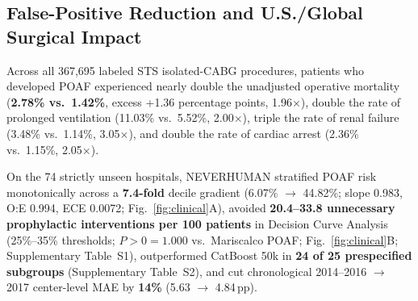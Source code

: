 \subsection{False-Positive Reduction and U.S./Global Surgical Impact}
Across all 367,695 labeled STS isolated-CABG procedures, patients who developed POAF experienced nearly double the unadjusted operative mortality (\textbf{2.78\% vs.\ 1.42\%}, excess +1.36 percentage points, 1.96$\times$), double the rate of prolonged ventilation (11.03\% vs.\ 5.52\%, 2.00$\times$), triple the rate of renal failure (3.48\% vs.\ 1.14\%, 3.05$\times$), and double the rate of cardiac arrest (2.36\% vs.\ 1.15\%, 2.05$\times$).

On the 74 strictly unseen hospitals, NEVERHUMAN stratified POAF risk monotonically across a \textbf{7.4-fold} decile gradient (6.07\% $\to$ 44.82\%; slope 0.983, O:E 0.994, ECE 0.0072; Fig.~\ref{fig:clinical}A), avoided \textbf{20.4--33.8 unnecessary prophylactic interventions per 100 patients} in Decision Curve Analysis (25\%--35\% thresholds; $P{>}0 = 1.000$ vs.\ Mariscalco POAF; Fig.~\ref{fig:clinical}B; Supplementary Table~S1), outperformed CatBoost 50k in \textbf{24 of 25 prespecified subgroups} (Supplementary Table~S2), and cut chronological 2014--2016 $\to$ 2017 center-level MAE by \textbf{14\%} (5.63 $\to$ 4.84\,pp).

